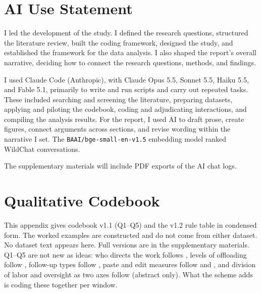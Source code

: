 \documentclass[manuscript,screen]{acmart}
\newcommand{\code}[1]{\texttt{#1}}
\begin{document}
\section{AI Use Statement}
\label{sec:aiuse}

I led the development of the study. I defined the research questions, structured the literature review, built the coding framework, designed the study, and established the framework for the data analysis. I also shaped the report's overall narrative, deciding how to connect the research questions, methods, and findings.

I used Claude Code (Anthropic), with Claude Opus 5.5, Sonnet 5.5, Haiku 5.5, and Fable 5.1, primarily to write and run scripts and carry out repeated tasks. These included searching and screening the literature, preparing datasets, applying and piloting the codebook, coding and adjudicating interactions, and compiling the analysis results. For the report, I used AI to draft prose, create figures, connect arguments across sections, and revise wording within the narrative I set. The \code{BAAI/bge-small-en-v1.5} embedding model ranked WildChat conversations.


The supplementary materials will include PDF exports of the AI chat logs.

\label{end:body}


\appendix
\setcounter{figure}{0}
\setcounter{table}{0}

\section{Qualitative Codebook}
\label{app:codebook}

This appendix gives codebook v1.1 (Q1--Q5) and the v1.2 rule table in condensed form. The worked examples are constructed and do not come from either dataset. No dataset text appears here. Full versions are in the supplementary materials. Q1--Q5 are not new as ideas: who directs the work follows \citet{poquet2026}, levels of offloading follow \citet{chen2026}, follow-up types follow \citet{mysore2025}, paste and edit measures follow \citet{jelson2026nirvana} and \citet{welzel2026}, and division of labor and oversight as two axes follow \citet{kim2025arcp} (abstract only). What the scheme adds is coding these together per window.
\end{document}
